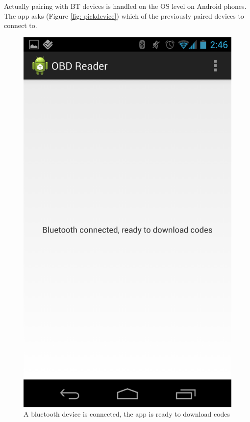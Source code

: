 \documentclass[12pt,letterpaper]{article}
\begin{document}
Actually pairing with BT devices is handled on the OS level on Android phones. The app asks (Figure \ref{fig: pickdevice}) which of the previously paired devices to connect to.

\begin{figure}[H]
\centering
\includegraphics[totalheight=15cm]{images/btconnected.png}
\caption{A bluetooth device is connected, the app is ready to download codes}
\label{fig: btconnected}
\end{figure}
\end{document}
